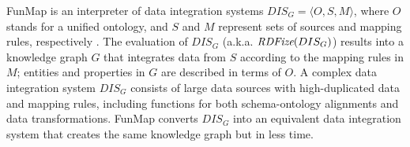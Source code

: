 FunMap is an interpreter of data integration systems $DIS_G = \langle O,S,M \rangle$, where $O$ stands for a unified ontology, and $S$ and $M$ represent sets of sources and mapping rules, respectively \citep{Lenzerini02}. The evaluation of $DIS_G$ (a.k.a. $\emph{RDFize}(DIS_G)$) results into a knowledge graph $G$ that integrates data from $S$ according to the mapping rules in $M$; entities and properties in $G$ are described in terms of $O$. A complex data integration system $DIS_G$ consists of large data sources with high-duplicated data and mapping rules, including functions for both schema-ontology alignments and data transformations. FunMap converts $DIS_G$ into an equivalent data integration system that creates the same knowledge graph but in less time.


